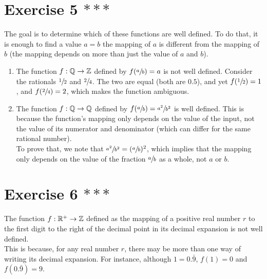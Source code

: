 \documentclass[12pt]{article}
\begin{document}
    \section*{Exercise 5 $***$}
    The goal is to determine which of these functions are well defined.
    To do that, it is enough to find a value $a = b$
    the mapping of $a$ is different from the mapping of $b$
    (the mapping depends on more than just the value of $a$ and $b$).
    \begin{enumerate}[label=\textbf{\alph*.}]
        \item 
            The function $f: \mathbb{Q} \to \mathbb{Z}$
            defined by $f(\sfrac{a}{b}) = a$ is not well defined.
            Consider the rationals $\sfrac{1}{2}$ and $\sfrac{2}{4}$.
            The two are equal (both are $0.5$),
            and yet $f(\sfrac{1}{2}) = 1$,
            and $f(\sfrac{2}{4}) = 2$,
            which makes the function ambiguous.
        \item
            The function $f: \mathbb{Q} \to \mathbb{Q}$
            defined by $f(\sfrac{a}{b}) = \sfrac{a^2}{b^2}$
            is well defined.
            This is because the function's mapping only depends on
            the value of the input,
            not the value of its numerator and denominator
            (which can differ for the same rational number). \\
            To prove that,
            we note that $\sfrac{a^2}{b^2} = (\sfrac{a}{b})^2$,
            which implies that the mapping only depends on
            the value of the fraction $\sfrac{a}{b}$ as a whole,
            not $a$ or $b$.
    \end{enumerate}

    \section*{Exercise 6 $***$}
    The function $f: \mathbb{R}^+ \to \mathbb{Z}$
    defined as the mapping of a positive real number $r$
    to the first digit to the right of the decimal point in its
    decimal expansion is not well defined. \\
    This is because,
    for any real number $r$,
    there may be more than one way of writing its decimal expansion.
    For instance, although $1 = 0.\bar{9}$,
    $f(1) = 0$ and $f(0.\bar{9}) = 9$. \\
\end{document}
